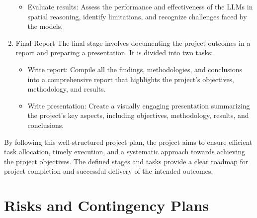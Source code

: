 \documentclass[journal,10pt]{IEEEtran}
\begin{document}
\begin{enumerate}
\begin{itemize}
        \item Evaluate results: Assess the performance and effectiveness of the LLMs in spatial reasoning, identify limitations, and recognize challenges faced by the models.
    \end{itemize}
    \item Final Report
    \subitem The final stage involves documenting the project outcomes in a report and preparing a presentation. It is divided into two tasks:
    \begin{itemize}
        \item Write report: Compile all the findings, methodologies, and conclusions into a comprehensive report that highlights the project's objectives, methodology, and results.
        \item Write presentation: Create a visually engaging presentation summarizing the project's key aspects, including objectives, methodology, results, and conclusions.
    \end{itemize}
\end{enumerate}

By following this well-structured project plan, the project aims to ensure efficient task allocation, timely execution, and a systematic approach towards achieving the project objectives. The defined stages and tasks provide a clear roadmap for project completion and successful delivery of the intended outcomes.



\newpage
\section{Risks and Contingency Plans}



\end{document}
